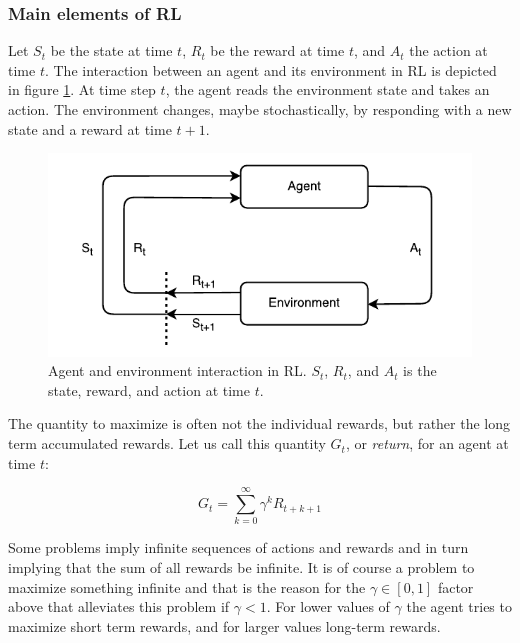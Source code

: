 \subsubsection{Main elements of RL}

Let $S_t$ be the state at time $t$, $R_t$ be the reward at time $t$, and $A_t$
the action at time $t$. The interaction between an agent and its environment in
RL is depicted in figure \ref{fig:rl_flowchart}. At time step $t$, the agent reads
the environment state and takes an action. The environment changes, maybe
stochastically, by responding with a new state and a reward at time $t+1$. 

\begin{figure}[h]
    \centering
    \includegraphics[]{res/agent_environment_interaction.pdf}

    \caption{Agent and environment interaction in RL. $S_t$, $R_t$, and $A_t$
             is the state, reward, and action at time $t$.}

    \label{fig:rl_flowchart}
\end{figure}

The quantity to maximize is often not the individual rewards, but rather the
long term accumulated rewards. Let us call this quantity $G_t$, or
\textit{return}, for an agent at time $t$:

\begin{equation}
    G_t = \sum_{k=0}^\infty \gamma^k R_{t+k+1}
\end{equation}

Some problems imply infinite sequences of actions and rewards and in turn
implying that the sum of all rewards be infinite. It is of course a problem to
maximize something infinite and that is the reason for the $\gamma \in \left[0, 1\right]$ factor above
that alleviates this problem if $\gamma < 1$. For lower values of $\gamma$ the agent
tries to maximize short term rewards, and for larger values long-term rewards. 

